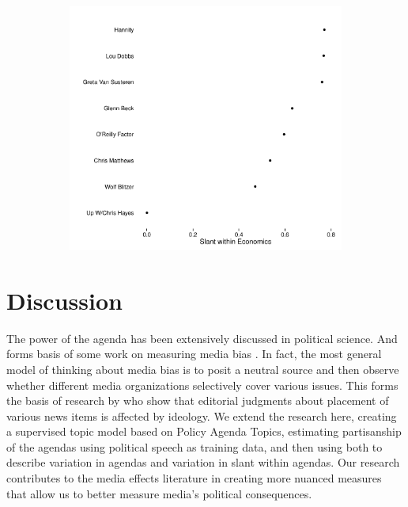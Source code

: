 \documentclass[12pt, letterpaper]{article}
\begin{document}
\begin{figure}[H]
\begin{subfigure}[t]{0.48\textwidth}
    \includegraphics[width=\textwidth]{../figs/econ_prefs.pdf}
    \end{subfigure}
\end{figure}


\section*{Discussion}
The power of the agenda has been extensively discussed in political science. And forms basis of some work on measuring media bias \citep[see for instance,]{larcinese2011partisan}. In fact, the most general model of thinking about media bias is to posit a neutral source and then observe whether different media organizations selectively cover various issues. This forms the basis of research by \citep{baum2008new} who show that editorial judgments about placement of various news items is affected by ideology. We extend the research here, creating a supervised topic model based on Policy Agenda Topics, estimating partisanship of the agendas using political speech as training data, and then using both to describe variation in agendas and variation in slant within agendas. Our research contributes to the media effects literature in creating more nuanced measures that allow us to better measure media's political consequences. 
\end{document}
